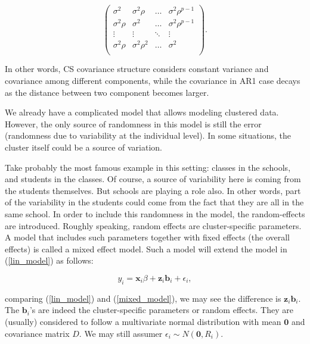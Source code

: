 \documentclass[11pt,a5paper,twoside]{book}
\begin{document}
\begin{equation}
\label{cov_ar1}
\left(
\begin{array}{cccc}
\sigma^2  & \sigma^2\rho & \ldots & \sigma^2\rho^{p-1} \\
\sigma^2\rho & \sigma^2  & \ldots & \sigma^2\rho^{p-1}  \\
\vdots & \vdots & \ddots & \vdots \\
\sigma^2\rho & \sigma^2\rho^2 & \ldots & \sigma^2  \\
\end{array} \right).
\end{equation}

In other words, CS covariance structure considers constant variance and covariance among different components, while the covariance in AR1 case decays as the distance between two component becomes larger. 

We already have a complicated model that allows modeling clustered data. However, the only source of randomness in this model is still the error (randomness due to variability at the individual level). In some situations, the cluster itself could be a source of variation. 

Take probably the most famous example in this setting: classes in the schools, and students in the classes. Of course, a source of variability here is coming from the students themselves. But schools are playing a role also. In other words, part of the variability in the students could come from the fact that they are all in the same school. In order to include this randomness in the model, the random-effects are introduced. Roughly speaking, random effects are cluster-specific parameters. A model that includes such parameters together with fixed effects (the overall effects) is called a mixed effect model. Such a model will extend the model in (\ref{lin_model}) as follows:

\begin{equation}
\label{mixed_model}
y_i = \mathbf{x}_i \beta + \mathbf{z}_i \mathbf{b}_i + \epsilon_i,
\end{equation}

comparing (\ref{lin_model}) and (\ref{mixed_model}), we may see the difference is $\mathbf{z}_i \mathbf{b}_i$. The $\mathbf{b}_i$'s are indeed the cluster-specific parameters or random effects. They are (usually) considered to follow a multivariate normal distribution with mean $\mathbf{0}$ and covariance matrix $D$. We may still assumer $\epsilon_i \sim N(\mathbf{0}, R_i)$. 
\end{document}
